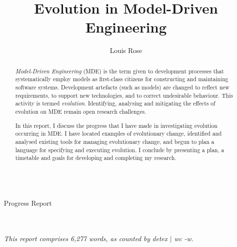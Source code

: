 \documentclass[a4paper,10pt]{article}
\title{Evolution in Model-Driven Engineering}
\author{Louis Rose}
\makeatletter
\renewcommand{\maketitle}{
  \begin{titlepage}
    \center
    \vspace*{\stretch{1}}
    \textsf{\huge \bfseries\sf \@title}\\
    \bigskip
    {\LARGE Progress Report}\\
    \vspace*{\stretch{1}}
    {\Large \@author}\\
    \bigskip
    {\Large \@date}\\
    \vspace*{\stretch{2}}
  \end{titlepage}
}
\makeatother
\begin{document}

\maketitle

\begin{abstract}
\textit{Model-Driven Engineering} (MDE) is the term given to development processes that systematically employ models as first-class citizens for constructing and maintaining software systems. Development artefacts (such as models) are changed to reflect new requirements, to support new technologies, and to correct undesirable behaviour. This activity is termed \textit{evolution}. Identifying, analysing and mitigating the effects of evolution on MDE remain open research challenges.

In this report, I discuss the progress that I have made in investigating evolution occurring in MDE. I have located examples of evolutionary change, identified and analysed existing tools for managing evolutionary change, and begun to plan a language for specifying and executing evolution. I conclude by presenting a plan, a timetable and goals for developing and completing my research.
\end{abstract}

\vspace{2mm}

\begin{center}
  \small{\textit{This report comprises 6,277 words, as counted by detex $|$ wc -w.}}
\end{center}

\newpage
\tableofcontents
\newpage








\end{document}
